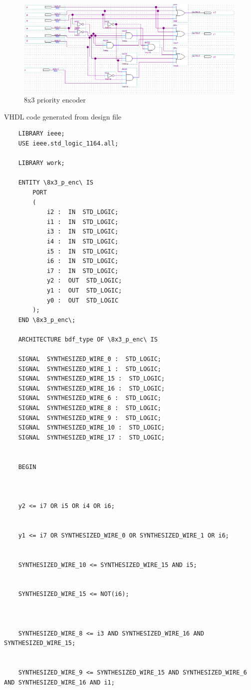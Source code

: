 \documentclass[12pt]{article}
\begin{document}
\begin{figure}[h]
\caption{8x3 priority encoder}
\centering
\includegraphics[width=\textwidth]{./diagrams/8x3_penc_design.png}
\end{figure}
{VHDL code generated from design file}
\begin{verbatim}
    LIBRARY ieee;
    USE ieee.std_logic_1164.all;

    LIBRARY work;

    ENTITY \8x3_p_enc\ IS
    	PORT
    	(
    		i2 :  IN  STD_LOGIC;
    		i1 :  IN  STD_LOGIC;
    		i3 :  IN  STD_LOGIC;
    		i4 :  IN  STD_LOGIC;
    		i5 :  IN  STD_LOGIC;
    		i6 :  IN  STD_LOGIC;
    		i7 :  IN  STD_LOGIC;
    		y2 :  OUT  STD_LOGIC;
    		y1 :  OUT  STD_LOGIC;
    		y0 :  OUT  STD_LOGIC
    	);
    END \8x3_p_enc\;

    ARCHITECTURE bdf_type OF \8x3_p_enc\ IS

    SIGNAL	SYNTHESIZED_WIRE_0 :  STD_LOGIC;
    SIGNAL	SYNTHESIZED_WIRE_1 :  STD_LOGIC;
    SIGNAL	SYNTHESIZED_WIRE_15 :  STD_LOGIC;
    SIGNAL	SYNTHESIZED_WIRE_16 :  STD_LOGIC;
    SIGNAL	SYNTHESIZED_WIRE_6 :  STD_LOGIC;
    SIGNAL	SYNTHESIZED_WIRE_8 :  STD_LOGIC;
    SIGNAL	SYNTHESIZED_WIRE_9 :  STD_LOGIC;
    SIGNAL	SYNTHESIZED_WIRE_10 :  STD_LOGIC;
    SIGNAL	SYNTHESIZED_WIRE_17 :  STD_LOGIC;


    BEGIN



    y2 <= i7 OR i5 OR i4 OR i6;


    y1 <= i7 OR SYNTHESIZED_WIRE_0 OR SYNTHESIZED_WIRE_1 OR i6;


    SYNTHESIZED_WIRE_10 <= SYNTHESIZED_WIRE_15 AND i5;


    SYNTHESIZED_WIRE_15 <= NOT(i6);



    SYNTHESIZED_WIRE_8 <= i3 AND SYNTHESIZED_WIRE_16 AND SYNTHESIZED_WIRE_15;


    SYNTHESIZED_WIRE_9 <= SYNTHESIZED_WIRE_15 AND SYNTHESIZED_WIRE_6 AND SYNTHESIZED_WIRE_16 AND i1;



\end{verbatim}
\end{document}
